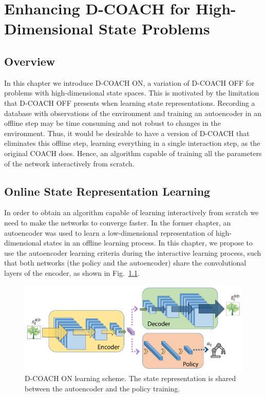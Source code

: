 \chapter{Enhancing D-COACH for High-Dimensional State Problems}
\section{Overview}

In this chapter we introduce  D-COACH ON, a variation of D-COACH OFF for problems with high-dimensional state spaces. This is motivated by the limitation that D-COACH OFF presents when learning state representations. Recording a database with observations of the environment and training an autoencoder in an offline step may be time consuming and not robust to changes in the environment. Thus, it would be desirable to have a version of D-COACH that eliminates this offline step, learning everything in a single interaction step, as the original COACH does. Hence, an algorithm capable of training all the parameters of the network interactively from scratch. 

\section{Online State Representation Learning}
In order to obtain an algorithm capable of learning interactively from scratch we need to make the networks to converge faster. In the former chapter, an autoencoder was used to learn a low-dimensional representation of high-dimensional states in an offline learning process. In this chapter, we propose to use the autoencoder learning criteria during the interactive learning process, such that both networks (the policy and the autoencoder) share the convolutional layers of the encoder, as shown in Fig.~\ref{fig:msim}.

\begin{figure}[H]
    \centering
    \includegraphics[width=\linewidth]{imagenes/cap2/m2.pdf}
    \caption[D-COACH ON learning scheme.]{D-COACH ON learning scheme. The state representation is shared between the autoencoder and the policy training.}
    \label{fig:msim}
\end{figure}


